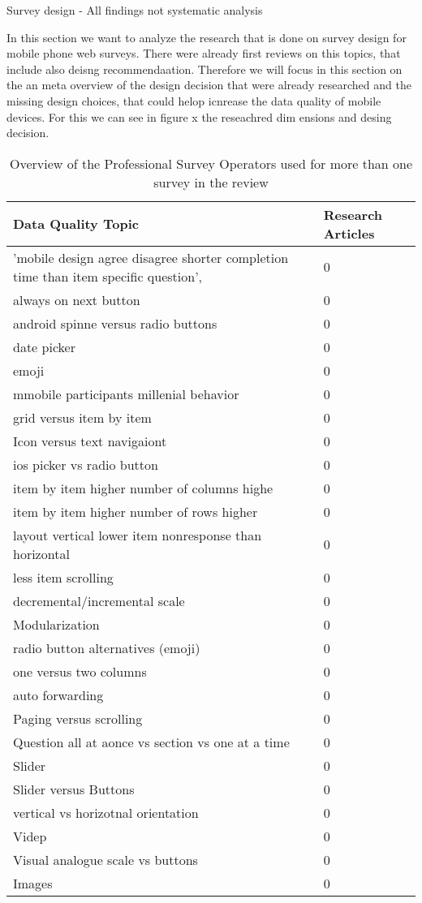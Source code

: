Survey design
- All findings not systematic analysis

In this section we want to analyze the research that is done on survey design for mobile phone web surveys. There were already first reviews on this topics, that include also deisng recommendaation. Therefore we will focus in this section on the an meta overview of the design decision that were already researched and the missing design choices, that could helop icnrease the data quality of mobile devices. For this we can see in figure x the reseachred dim ensions and desing decision.


\begin{table}
	\centering
	\begin{tabular}{ll}
		\toprule
		Data Quality Topic  &  Research Articles \\
		\midrule
         'mobile design agree disagree shorter completion time than item specific question',   & 0  \\
         always on next button   & 0  \\
        android spinne versus radio buttons   & 0  \\
        date picker    & 0  \\
        emoji    & 0  \\
        mmobile participants millenial behavior    & 0  \\
        grid versus item by item    & 0  \\
        Icon versus text navigaiont & 0 \\
        ios picker vs radio button    & 0  \\
        item by item higher number of columns highe    & 0  \\
        item by item higher number of rows higher    & 0  \\
        layout vertical lower item nonresponse than horizontal    & 0  \\
        less item scrolling   & 0  \\
        decremental/incremental scale    & 0  \\
        Modularization    & 0  \\
        radio button alternatives (emoji)    & 0  \\
        one versus two columns    & 0  \\
        auto forwarding    & 0  \\
        Paging versus scrolling    & 0  \\
        Question all at aonce vs section vs one at a time & 0 \\
        Slider & 0 \\
        Slider versus Buttons  & 0 \\
        vertical vs horizotnal orientation &0 \\
        Videp & 0  \\
        Visual analogue scale vs buttons & 0 \\
        Images & 0 \\
		\bottomrule 
	\end{tabular}
	\caption{Overview of the Professional Survey Operators used for more than one survey in the review}
	\label{tab: design}
\end{table}


